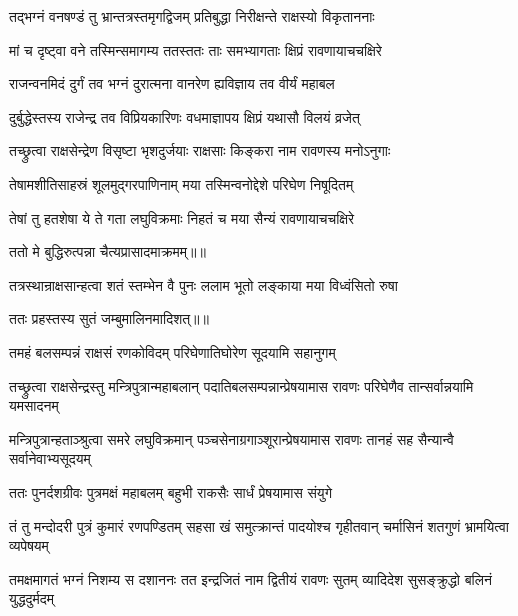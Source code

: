 \twolineshloka
{तद्भग्नं वनषण्डं तु भ्रान्तत्रस्तमृगद्विजम्}
{प्रतिबुद्धा निरीक्षन्ते राक्षस्यो विकृताननाः} %

\twolineshloka
{मां च दृष्ट्वा वने तस्मिन्समागम्य ततस्ततः}
{ताः समभ्यागताः क्षिप्रं रावणायाचचक्षिरे} %

\twolineshloka
{राजन्वनमिदं दुर्गं तव भग्नं दुरात्मना}
{वानरेण ह्यविज्ञाय तव वीर्यं महाबल} %

\twolineshloka
{दुर्बुद्धेस्तस्य राजेन्द्र तव विप्रियकारिणः}
{वधमाज्ञापय क्षिप्रं यथासौ विलयं व्रजेत्} %

\twolineshloka
{तच्छ्रुत्वा राक्षसेन्द्रेण विसृष्टा भृशदुर्जयाः}
{राक्षसाः किङ्करा नाम रावणस्य मनोऽनुगाः} %

\twolineshloka
{तेषामशीतिसाहस्रं शूलमुद्गरपाणिनाम्}
{मया तस्मिन्वनोद्देशे परिघेण निषूदितम्} %

\twolineshloka
{तेषां तु हतशेषा ये ते गता लघुविक्रमाः}
{निहतं च मया सैन्यं रावणायाचचक्षिरे} %

{ततो मे बुद्धिरुत्पन्ना चैत्यप्रासादमाक्रमम्॥॥} %

\addtocounter{shlokacount}{1}

\twolineshloka
{तत्रस्थान्राक्षसान्हत्वा शतं स्तम्भेन वै पुनः}
{ललाम भूतो लङ्काया मया विध्वंसितो रुषा} %

{ततः प्रहस्तस्य सुतं जम्बुमालिनमादिशत्॥॥} %

\addtocounter{shlokacount}{1}

\twolineshloka
{तमहं बलसम्पन्नं राक्षसं रणकोविदम्}
{परिघेणातिघोरेण सूदयामि सहानुगम्} %

\threelineshloka
{तच्छ्रुत्वा राक्षसेन्द्रस्तु मन्त्रिपुत्रान्महाबलान्}
{पदातिबलसम्पन्नान्प्रेषयामास रावणः}
{परिघेणैव तान्सर्वान्नयामि यमसादनम्} %

\threelineshloka
{मन्त्रिपुत्रान्हताञ्श्रुत्वा समरे लघुविक्रमान्}
{पञ्चसेनाग्रगाञ्शूरान्प्रेषयामास रावणः}
{तानहं सह सैन्यान्वै सर्वानेवाभ्यसूदयम्} %

\twolineshloka
{ततः पुनर्दशग्रीवः पुत्रमक्षं महाबलम्}
{बहुभी राकसैः सार्धं प्रेषयामास संयुगे} %

\threelineshloka
{तं तु मन्दोदरी पुत्रं कुमारं रणपण्डितम्}
{सहसा खं समुत्क्रान्तं पादयोश्च गृहीतवान्}
{चर्मासिनं शतगुणं भ्रामयित्वा व्यपेषयम्} %

\threelineshloka
{तमक्षमागतं भग्नं निशम्य स दशाननः}
{तत इन्द्रजितं नाम द्वितीयं रावणः सुतम्}
{व्यादिदेश सुसङ्क्रुद्धो बलिनं युद्धदुर्मदम्} %

